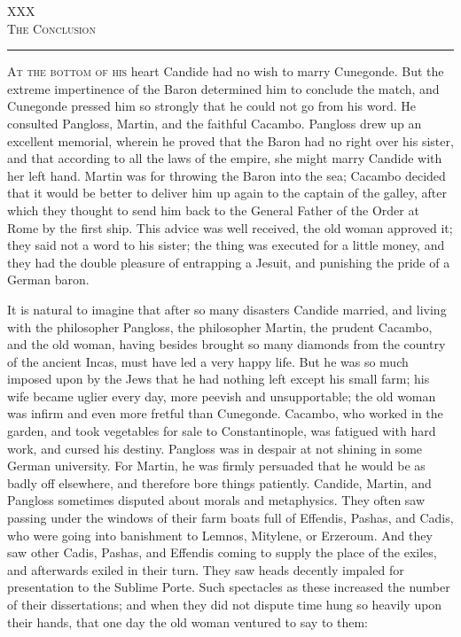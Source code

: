 \begin{center}
XXX\\
\textsc{The Conclusion}
\end{center}
\vspace{-0.5cm}
\rule{\textwidth}{0.5pt}
\lettrine{A}{t the bottom of his} heart Candide had no wish to marry Cunegonde. But the extreme impertinence of the Baron determined him to conclude the match, and Cunegonde pressed him so strongly that he could not go from his word. He consulted Pangloss, Martin, and the faithful Cacambo. Pangloss drew up an excellent memorial, wherein he proved that the Baron had no right over his sister, and that according to all the laws of the empire, she might marry Candide with her left hand. Martin was for throwing the Baron into the sea; Cacambo decided that it would be better to deliver him up again to the captain of the galley, after which they thought to send him back to the General Father of the Order at Rome by the first ship. This advice was well received, the old woman approved it; they said not a word to his sister; the thing was executed for a little money, and they had the double pleasure of entrapping a Jesuit, and punishing the pride of a German baron.

It is natural to imagine that after so many disasters Candide married, and living with the philosopher Pangloss, the philosopher Martin, the prudent Cacambo, and the old woman, having besides brought so many diamonds from the country of the ancient Incas, must have led a very happy life. But he was so much imposed upon by the Jews that he had nothing left except his small farm; his wife became uglier every day, more peevish and unsupportable; the old woman was infirm and even more fretful than Cunegonde. Cacambo, who worked in the garden, and took vegetables for sale to Constantinople, was fatigued with hard work, and cursed his destiny. Pangloss was in despair at not shining in some German university. For Martin, he was firmly persuaded that he would be as badly off elsewhere, and therefore bore things patiently. Candide, Martin, and Pangloss sometimes disputed about morals and metaphysics. They often saw passing under the windows of their farm boats full of Effendis, Pashas, and Cadis, who were going into banishment to Lemnos, Mitylene, or Erzeroum. And they saw other Cadis, Pashas, and Effendis coming to supply the place of the exiles, and afterwards exiled in their turn. They saw heads decently impaled for presentation to the Sublime Porte. Such spectacles as these increased the number of their dissertations; and when they did not dispute time hung so heavily upon their hands, that one day the old woman ventured to say to them:

